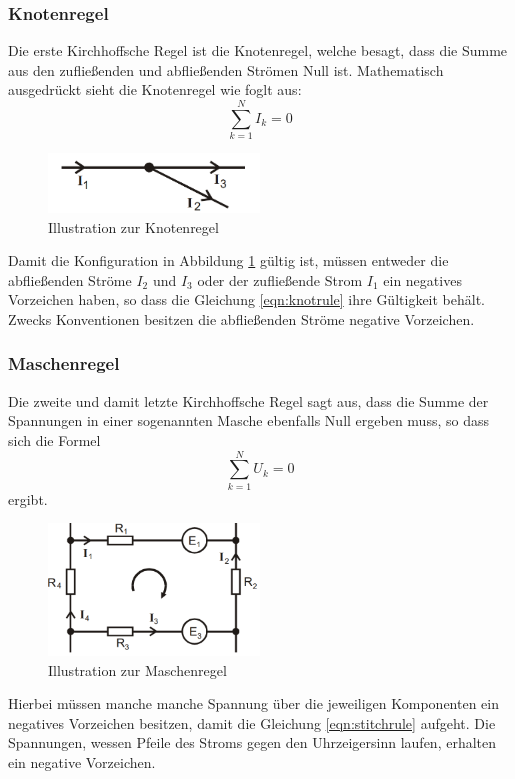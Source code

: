 \subsubsection{Knotenregel}
Die erste Kirchhoffsche Regel ist die Knotenregel, welche besagt, dass die Summe aus den zufließenden und abfließenden Strömen Null ist.
Mathematisch ausgedrückt sieht die Knotenregel wie foglt aus:
\begin{equation}
    \sum_{k=1}^N I_k = 0 \label{eqn:knotrule}
\end{equation} 
\begin{figure}
    \centering
    \caption{Illustration zur Knotenregel}
    \label{fig:knotrule}
    \includegraphics[width = 0.5\textwidth]{bridges/knotrule.png}
\end{figure}
Damit die Konfiguration in Abbildung \ref{fig:knotrule} gültig ist, müssen entweder die abfließenden Ströme $I_2$ und $I_3$ oder 
der zufließende Strom $I_1$ ein negatives Vorzeichen haben, so dass die Gleichung \eqref{eqn:knotrule} ihre Gültigkeit 
behält. Zwecks Konventionen besitzen die abfließenden Ströme negative Vorzeichen.
\subsubsection{Maschenregel}
Die zweite und damit letzte Kirchhoffsche Regel sagt aus, dass die Summe der Spannungen in einer sogenannten Masche ebenfalls Null ergeben muss, so dass sich die Formel
\begin{equation}
    \sum_{k=1}^N U_k = 0 \label{eqn:stitchrule}
\end{equation}
ergibt.
\begin{figure}
    \centering
    \caption{Illustration zur Maschenregel}
    \label{fig:stitchrule}
    \includegraphics[width=0.5\textwidth]{bridges/stitchrule.png}
\end{figure}
Hierbei müssen manche manche Spannung über die jeweiligen Komponenten ein negatives Vorzeichen besitzen, damit die Gleichung \eqref{eqn:stitchrule} aufgeht.
Die Spannungen, wessen Pfeile des Stroms gegen den Uhrzeigersinn laufen, erhalten ein negative Vorzeichen.
